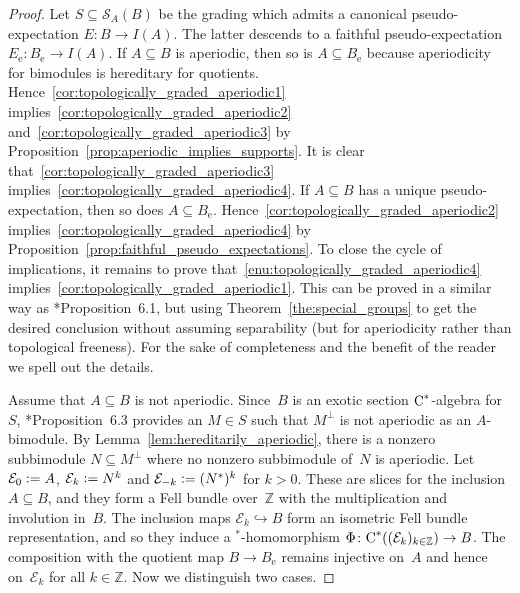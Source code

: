 \documentclass[a4paper]{amsart}
\theoremstyle{plain}
\theoremstyle{definition}
\theoremstyle{remark}
\numberwithin{theorem}{section}
\numberwithin{equation}{section}
\newcommand*{\nb}{\nobreakdash}
\newcommand*{\Star}{\(^*\)\nobreakdash-}
\newcommand*{\Z}{\mathbb Z}
\newcommand*{\ess}{\mathrm{e}}%
\newcommand*{\Cst}{\textup C^*}%
\newcommand*{\Slice}{\mathcal S}%
\newcommand*{\Hilm}[1][E]{\mathcal #1}%
\newcommand*{\defeq}{\mathrel{\vcentcolon=}}%
\begin{document}
\begin{proof}
  Let \(S\subseteq \Slice_A(B)\) be the grading which admits a
  canonical pseudo-expectation \(E\colon B\to I(A)\).
  The latter descends to a faithful pseudo-expectation \(E_\ess\colon
  B_\ess\to I(A)\).
  If \(A\subseteq B\) is aperiodic, then so is \(A\subseteq B_\ess\)
  because aperiodicity for bimodules is hereditary for quotients.
  Hence~\ref{cor:topologically_graded_aperiodic1}
  implies~\ref{cor:topologically_graded_aperiodic2}
  and~\ref{cor:topologically_graded_aperiodic3} by
  Proposition~\ref{prop:aperiodic_implies_supports}.
  It is clear that~\ref{cor:topologically_graded_aperiodic3}
  implies~\ref{cor:topologically_graded_aperiodic4}.
  If \(A\subseteq B\) has a unique pseudo-expectation, then so
  does \(A\subseteq B_\ess\).
  Hence~\ref{cor:topologically_graded_aperiodic2}
  implies~\ref{cor:topologically_graded_aperiodic4} by
  Proposition~\ref{prop:faithful_pseudo_expectations}.
  To close the cycle of implications, it remains to prove
  that~\ref{enu:topologically_graded_aperiodic4}
  implies~\ref{cor:topologically_graded_aperiodic1}.
  This can be  proved in a similar way as
  \cite{Kwasniewski-Meyer:Aperiodicity_pseudo_expectations}*{Proposition~6.1},
  but using Theorem~\ref{the:special_groups} to get the desired
  conclusion without assuming separability (but for aperiodicity
  rather than topological freeness).
  For the sake of completeness and the benefit of the reader we spell
  out the details.

  Assume that \(A\subseteq B\) is not aperiodic.
  Since~\(B\) is an exotic section \(\Cst\)\nb-algebra for~\(S\),
  \cite{Kwasniewski-Meyer:Essential}*{Proposition~6.3} provides an
  \(M\in S\)  such that \(M^\bot\)  is not
  aperiodic as an \(A\)\nb-bimodule.
  By Lemma~\ref{lem:hereditarily_aperiodic}, there is a nonzero subbimodule  \(N\subseteq M^\bot\)
	where no nonzero subbimodule of~\(N\) is aperiodic.
  Let \(\Hilm_0 \defeq A\), \(\Hilm_k \defeq N^k\) and \(\Hilm_{-k}
  \defeq (N^*)^k\) for \(k>0\).
  These are slices for the inclusion \(A\subseteq B\),
  and they form a Fell bundle over~\(\Z\) with the multiplication
  and involution in~\(B\).
  The inclusion maps \(\Hilm_k \hookrightarrow B\) form an
  isometric Fell bundle representation, and so they induce a
  \Star{}homomorphism \(\Phi\colon \Cst((\Hilm_k)_{k\in \Z}) \to
  B\).
  The composition with the quotient map \(B\to B_\ess\) remains
  injective on~\(A\) and hence on~\(\Hilm_k\) for all \(k\in \Z\).
  Now we distinguish two cases.


\end{proof}
\end{document}

